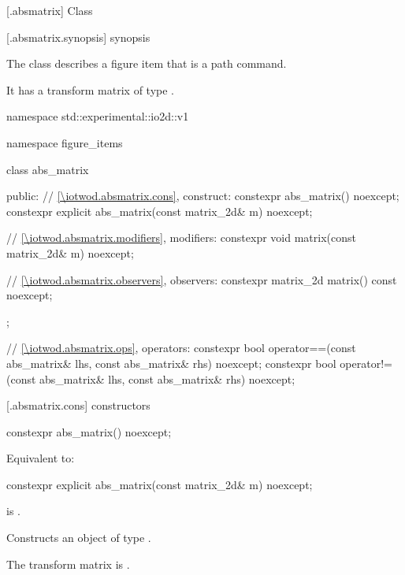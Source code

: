  [\iotwod.absmatrix] {Class }%

 [\iotwod.absmatrix.synopsis] { synopsis}%

\pnum
{}%
The class  describes a figure item that is a path command.

\pnum
It has a transform matrix of type .

\begin{codeblock}
namespace std::experimental::io2d::v1 {
  namespace figure_items {
    class abs_matrix {
    public:
      // \ref{\iotwod.absmatrix.cons}, construct:
      constexpr abs_matrix() noexcept;
      constexpr explicit abs_matrix(const matrix_2d& m) noexcept;

      // \ref{\iotwod.absmatrix.modifiers}, modifiers:
      constexpr void matrix(const matrix_2d& m) noexcept;

      // \ref{\iotwod.absmatrix.observers}, observers:
      constexpr matrix_2d matrix() const noexcept;
    };
    
    // \ref{\iotwod.absmatrix.ops}, operators:
    constexpr bool operator==(const abs_matrix& lhs, const abs_matrix& rhs) 
      noexcept;
    constexpr bool operator!=(const abs_matrix& lhs, const abs_matrix& rhs) 
      noexcept;
  }
}
\end{codeblock}

 [\iotwod.absmatrix.cons] { constructors}

%
\begin{itemdecl}
constexpr abs_matrix() noexcept;
\end{itemdecl}
\begin{itemdescr}
\pnum
\effects
Equivalent to: 
\end{itemdescr}

%
\begin{itemdecl}
constexpr explicit abs_matrix(const matrix_2d& m) noexcept;
\end{itemdecl}
\begin{itemdescr}
\pnum
\requires
{} is .

\pnum
\effects
Constructs an object of type .

\pnum
The transform matrix is .
\end{itemdescr}

